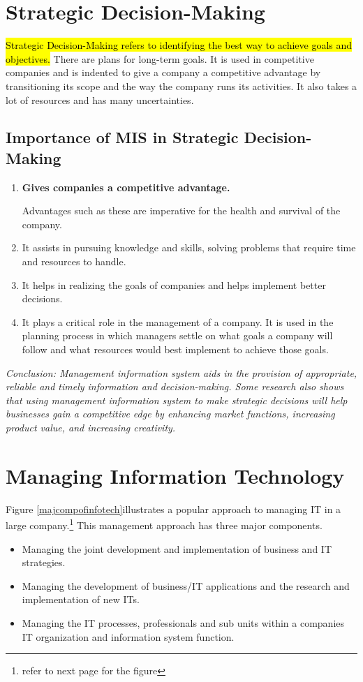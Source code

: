 \documentclass[12pt, a4paper]{article}
\begin{document}
\section{Strategic Decision-Making}%
\hl{Strategic Decision-Making refers to identifying the best way to achieve
goals and objectives.} There are plans for long-term goals. It is used in 
competitive companies and is indented to give a company a competitive
advantage by transitioning its scope and the way the company runs its
activities. It also takes a lot of resources and has many uncertainties.

\subsection{Importance of MIS in Strategic Decision-Making}
\begin{enumerate}
  \item \textbf{Gives companies a competitive advantage.}

    Advantages such as these are imperative for the health and survival of the
    company.

  \item It assists in pursuing knowledge and skills, solving problems that
    require time and resources to handle.

  \item It helps in realizing the goals of companies and helps implement
    better decisions.

  \item It plays a critical role in the management of a company. It is used
    in the planning process in which managers settle on what goals a company
    will follow and what resources would best implement to achieve those
    goals.
\end{enumerate}

\emph{Conclusion: Management information system aids in the provision of 
appropriate, reliable and timely information and decision-making. Some
research also shows that using management information system to make strategic
decisions will help businesses gain a competitive edge by enhancing market
functions, increasing product value, and increasing creativity.}%

\section{Managing Information Technology}%
Figure \ref{majcompofinfotech}illustrates a popular approach to managing IT in
a large company.\footnote{refer to next page for the figure}
This management approach has three major components.
\begin{itemize}
  \item Managing the joint development and implementation of business and IT 
    strategies.
  \item Managing the development of business/IT applications and the research
    and implementation of new ITs.
  \item Managing the IT processes, professionals and sub units within a
    companies IT organization and information system function.
\end{itemize}
\end{document}
